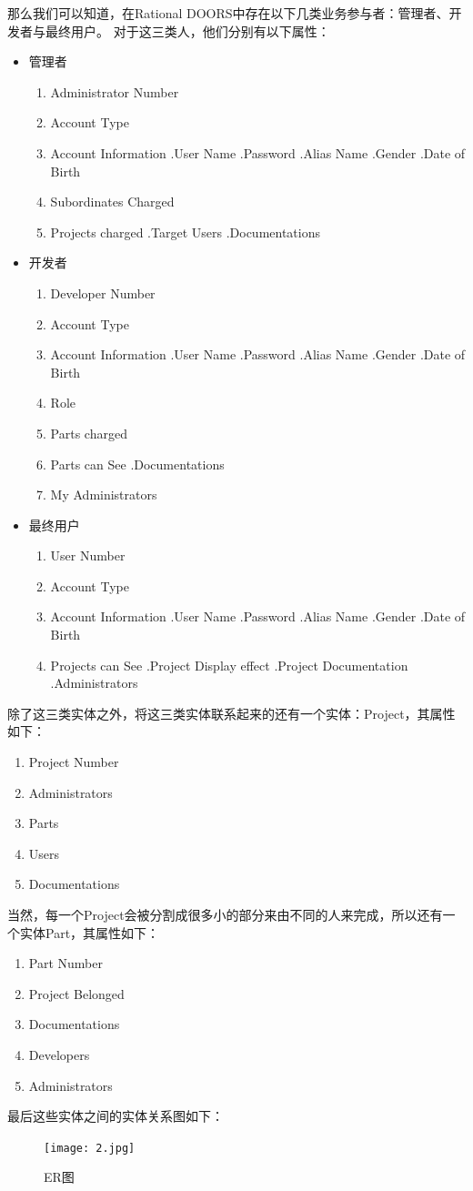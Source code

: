 \documentclass[UTF8]{ctexart}
\begin{document}
	那么我们可以知道，在Rational DOORS中存在以下几类业务参与者：管理者、开发者与最终用户。
	对于这三类人，他们分别有以下属性：
	\begin{itemize}
		\item 管理者
		\begin{enumerate}
			\item Administrator Number
			\item Account Type
			\item Account Information
			\subitem .User Name
			\subitem .Password
			\subitem .Alias Name
			\subitem .Gender
			\subitem .Date of Birth
			\item Subordinates Charged
			\item Projects charged
			\subitem .Target Users
			\subitem .Documentations
		\end{enumerate}
	
		\item 开发者
		\begin{enumerate}
			\item Developer Number
			\item Account Type
			\item Account Information
			\subitem .User Name
			\subitem .Password
			\subitem .Alias Name
			\subitem .Gender
			\subitem .Date of Birth
			\item Role
			\item Parts charged
			\item Parts can See
			\subitem .Documentations
			\item My Administrators
		\end{enumerate}
	
		\item 最终用户
		\begin{enumerate}
			\item User Number
			\item Account Type
			\item Account Information
			\subitem .User Name
			\subitem .Password
			\subitem .Alias Name
			\subitem .Gender
			\subitem .Date of Birth
			\item Projects can See
			\subitem .Project Display effect
			\subitem .Project Documentation
			\subitem .Administrators
		\end{enumerate}
	\end{itemize}
	除了这三类实体之外，将这三类实体联系起来的还有一个实体：Project，其属性如下：
	\begin{enumerate}
		\item Project Number
		\item Administrators
		\item Parts
		\item Users
		\item Documentations
	\end{enumerate}
	当然，每一个Project会被分割成很多小的部分来由不同的人来完成，所以还有一个实体Part，其属性如下：
	\begin{enumerate}
		\item Part Number
		\item Project Belonged
		\item Documentations
		\item Developers
		\item Administrators
	\end{enumerate} 
	最后这些实体之间的实体关系图如下：
	\begin{figure}
		\texttt{[image: 2.jpg]}
		\caption{ER图}
	\end{figure}
\end{document}
